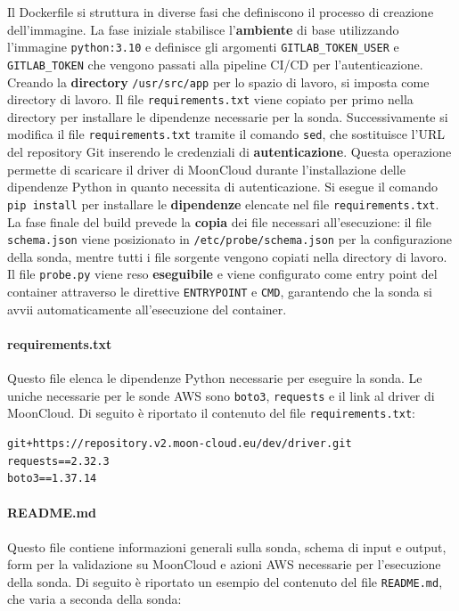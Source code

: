 Il Dockerfile si struttura in diverse fasi che definiscono il processo di creazione dell'immagine. La fase iniziale stabilisce l'\textbf{ambiente} di base utilizzando l'immagine \texttt{python:3.10} e definisce gli argomenti \texttt{GITLAB\_TOKEN\_USER} e \texttt{GITLAB\_TOKEN} che vengono passati alla pipeline CI/CD per l'autenticazione.
Creando la \textbf{directory} \texttt{/usr/src/app} per lo spazio di lavoro, si imposta come directory di lavoro. Il file \texttt{requirements.txt} viene copiato per primo nella directory per installare le dipendenze necessarie per la sonda.
Successivamente si modifica il file \texttt{requirements.txt} tramite il comando \texttt{sed}, che sostituisce l'URL del repository Git inserendo le credenziali di \textbf{autenticazione}. Questa operazione permette di scaricare il driver di MoonCloud durante l'installazione delle dipendenze Python in quanto necessita di autenticazione. Si esegue il comando \texttt{pip install} per installare le \textbf{dipendenze} elencate nel file \texttt{requirements.txt}.
La fase finale del build prevede la \textbf{copia} dei file necessari all'esecuzione: il file \texttt{schema.json} viene posizionato in \texttt{/etc/probe/schema.json} per la configurazione della sonda, mentre tutti i file sorgente vengono copiati nella directory di lavoro. Il file \texttt{probe.py} viene reso \textbf{eseguibile} e viene configurato come entry point del container attraverso le direttive \texttt{ENTRYPOINT} e \texttt{CMD}, garantendo che la sonda si avvii automaticamente all'esecuzione del container.

\paragraph{requirements.txt} Questo file elenca le dipendenze Python necessarie per eseguire la sonda. Le uniche necessarie per le sonde AWS sono \texttt{boto3}, \texttt{requests} e il link al driver di MoonCloud. Di seguito è riportato il contenuto del file \texttt{requirements.txt}:

\begin{lstlisting}[caption ={File \texttt{requirements.txt} per le dipendenze della sonda}]
git+https://repository.v2.moon-cloud.eu/dev/driver.git
requests==2.32.3
boto3==1.37.14
\end{lstlisting}

\paragraph{README.md} Questo file contiene informazioni generali sulla sonda, schema di input e output, form per la validazione su MoonCloud e azioni AWS necessarie per l'esecuzione della sonda. Di seguito è riportato un esempio del contenuto del file \texttt{README.md}, che varia a seconda della sonda:

